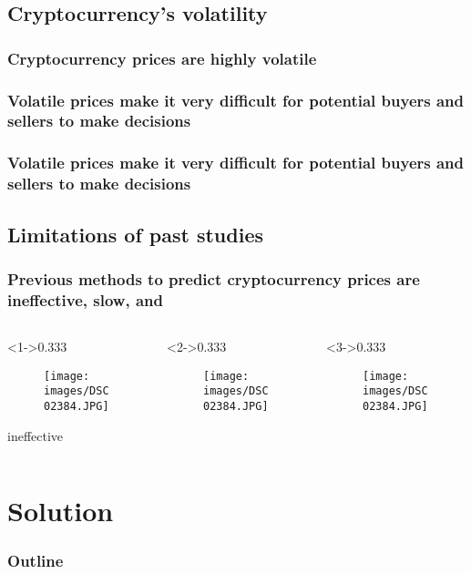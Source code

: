 \documentclass{beamer}
\begin{document}
\subsection{Cryptocurrency's volatility}
\begin{frame}
	\frametitle{Cryptocurrency prices are highly volatile}
\end{frame}
\begin{frame}
	\frametitle{Volatile prices make it very difficult for potential \textbf{buyers} and sellers to make decisions}
\end{frame}
\begin{frame}
	\frametitle{Volatile prices make it very difficult for potential buyers and \textbf{sellers} to make decisions}
\end{frame}
\subsection{Limitations of past studies}
\begin{frame}
	\frametitle{Previous methods to predict cryptocurrency prices are ineffective, slow, and }
	\begin{columns}[t]
		\begin{column}<1->{0.333\textwidth}
			\begin{figure}[H]
				\texttt{[image: images/DSC02384.JPG]}
			\end{figure}
		    \centering ineffective
		\end{column}
		\begin{column}<2->{0.333\textwidth}
			\begin{figure}[H]
				\texttt{[image: images/DSC02384.JPG]}
			\end{figure}
		\end{column}
		\begin{column}<3->{0.333\textwidth}
			\begin{figure}[H]
				\texttt{[image: images/DSC02384.JPG]}
			\end{figure}
		\end{column}
	\end{columns}
\end{frame}
\section{Solution}
\begin{frame}
	\frametitle{Outline}
	\tableofcontents[hideothersubsections]
\end{frame}
\end{document}

